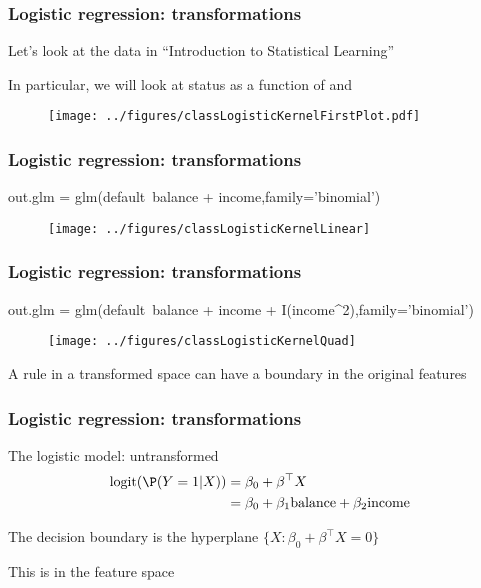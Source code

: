 \documentclass[12pt]{beamer}
\begin{document}
\begin{frame}
\frametitle{Logistic regression: transformations}
Let's look at the  data in ``Introduction to Statistical Learning''

\vsp
In particular, we will look at  status as a function of  and 
\begin{figure}
\centering
\texttt{[image: ../figures/classLogisticKernelFirstPlot.pdf]}
\end{figure}
\end{frame}

\begin{frame}[fragile]
\frametitle{Logistic regression: transformations}
\begin{blockcode}
out.glm  = glm(default~balance + income,family='binomial')
\end{blockcode}
\begin{figure}
\centering
\texttt{[image: ../figures/classLogisticKernelLinear]}
\end{figure}
\end{frame}



\begin{frame}[fragile]
\frametitle{Logistic regression: transformations}
\begin{blockcode}
out.glm  = glm(default~balance + income + 
                 I(income^2),family='binomial')
\end{blockcode}
\begin{figure}
\centering
\texttt{[image: ../figures/classLogisticKernelQuad]}
\end{figure}
 A  rule in a transformed space can have a  
boundary in the original features
\end{frame}

\begin{frame}[fragile]
\frametitle{Logistic regression: transformations}
 The logistic model: untransformed
\begin{align*}
\textrm{logit}(\P(Y = 1 | X))  
& = 
\beta_0 + \beta^{\top}X \\
& = 
\beta_0 + \beta_1\textrm{balance} +\beta_2\textrm{income}  
\end{align*}
\vsp

The decision boundary is the hyperplane $\{X : \beta_0 + \beta^{\top} X = 0\}$

\vsp
This is  in the feature space 
\end{frame}
\end{document}
